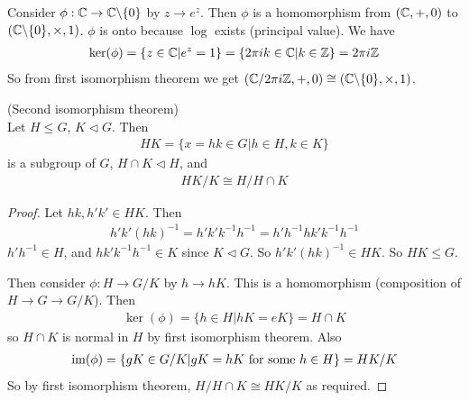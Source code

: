 \documentclass[a4paper]{article}
\begin{document}
\begin{eg}
Consider $\phi : \mathbb{C} \to \mathbb{C} \backslash \{0\}$ by $z \to e^z$. Then $\phi$ is a homomorphism from $(\mathbb{C},+,0)$ to $(\mathbb{C} \backslash \{0\},\times,1)$. $\phi$ is onto because $\log$ exists (principal value). We have
\begin{equation*}
\begin{aligned}
\ker(\phi) = \{z \in \mathbb{C} | e^z = 1\} = \{2\pi ik \in \mathbb{C} | k \in \mathbb{Z} \} = 2\pi i \mathbb{Z}
\end{aligned}
\end{equation*}
So from first isomorphism theorem we get $(\mathbb{C} / 2\pi i\mathbb{Z},+,0) \cong (\mathbb{C}\backslash\{0\},\times,1)$.
\end{eg}

\begin{thm} (Second isomorphism theorem)\\
Let $H \leq G$, $K \triangleleft G$. Then
\begin{equation*}
\begin{aligned}
HK = \{x=hk \in G | h \in H, k \in K\}
\end{aligned}
\end{equation*}
is a subgroup of $G$, $H \cap K \triangleleft H$, and
\begin{equation*}
\begin{aligned}
HK/K \cong H/H\cap K
\end{aligned}
\end{equation*}
\begin{proof}
Let $hk,h'k' \in HK$. Then
\begin{equation*}
\begin{aligned}
h'k'(hk)^{-1} = h'k'k^{-1}h^{-1}=h'h^{-1}hk'k^{-1}h^{-1}
\end{aligned}
\end{equation*}
$h'h^{-1}\in H$, and $hk'k^{-1}h^{-1} \in K$ since $K \triangleleft G$. So $h'k'(hk)^{-1} \in HK$. So $HK \leq G$.

Then consider $\phi: H \to G/K$ by $h \to hK$. This is a homomorphism (composition of $H \to G \to G/K$). Then
\begin{equation*}
\begin{aligned}
\ker(\phi) = \{h \in H|hK = eK\} = H \cap K
\end{aligned}
\end{equation*}
so $H\cap K$ is normal in $H$ by first isomorphism theorem. Also
\begin{equation*}
\begin{aligned}
\operatorname{im}(\phi)=\{gK\in G/K|gK=hK \text{ for some } h\in H\} =  HK/K
\end{aligned}
\end{equation*}
So by first isomorphism theorem, $H/H \cap K \cong HK/K$ as required.
\end{proof}
\end{thm}
\end{document}
